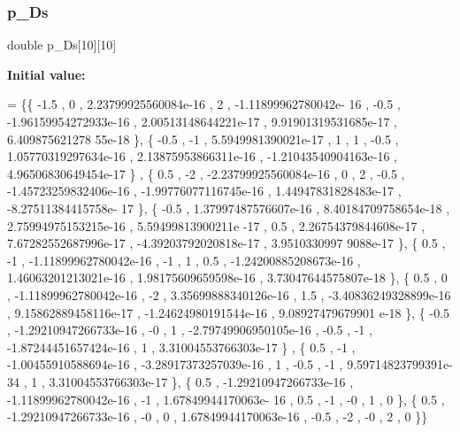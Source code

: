 \subsubsection{\texorpdfstring{p\+\_\+\+Ds}{p\_Ds}}
{\footnotesize\ttfamily double p\+\_\+\+Ds\mbox{[}10\mbox{]}\mbox{[}10\mbox{]}}

{\bfseries Initial value\+:}
\begin{DoxyCode}
= \{\{             -1.5 ,                 0 , 2.23799925560084e-16 ,                 2 , -1.11899962780042e-
      16 ,              -0.5 , -1.96159954272933e-16 , 2.00513148644221e-17 , 9.91901319531685e-17 , 6.409875621278
      55e-18 \},
\{             -0.5 ,                -1 , 5.5949981390021e-17 ,                 1 ,                 1 ,     
               -0.5 , 1.05770319297634e-16 , 2.13875953866311e-16 , -1.21043540904163e-16 , 4.96506830649454e-17 \}
      ,
\{              0.5 ,                -2 , -2.23799925560084e-16 ,                 0 ,                 2 ,   
                 -0.5 , -1.45723259832406e-16 , -1.99776077116745e-16 , 1.44947831828483e-17 , -8.27511384415758e-
      17 \},
\{             -0.5 , 1.37997487576607e-16 , 8.40184709758654e-18 , 2.75994975153215e-16 , 5.59499813900211e
      -17 ,               0.5 , 2.26754379844608e-17 , 7.67282552687996e-17 , -4.39203792020818e-17 , 3.9510330997
      9088e-17 \},
\{              0.5 ,                -1 , -1.11899962780042e-16 ,                -1 ,                 1 ,   
                  0.5 , -1.24200885208673e-16 , 1.46063201213021e-16 , 1.98175609659598e-16 , 3.73047644575807e-18
       \},
\{              0.5 ,                 0 , -1.11899962780042e-16 ,                -2 , 3.35699888340126e-16 ,
                     1.5 , -3.40836249328899e-16 , 9.15862889458116e-17 , -1.24624980191544e-16 , 9.08927479679901
      e-18 \},
\{             -0.5 , -1.29210947266733e-16 ,                -0 ,                 1 , -2.79749906950105e-16 
      ,              -0.5 ,                -1 , -1.87244451657424e-16 ,                 1 , 3.31004553766303e-17 \}
      ,
\{              0.5 ,                -1 , -1.00455910588694e-16 , -3.28917373257039e-16 ,                 1 
      ,              -0.5 ,                -1 , 9.59714823799391e-34 ,                 1 , 3.31004553766303e-17 \},
\{              0.5 , -1.29210947266733e-16 , -1.11899962780042e-16 ,                -1 , 1.67849944170063e-
      16 ,               0.5 ,                -1 ,                -0 ,                 1 ,                 0 \},
\{              0.5 , -1.29210947266733e-16 ,                -0 ,                 0 , 1.67849944170063e-16 ,
                    -0.5 ,                -2 ,                -0 ,                 2 ,                 0 \}\}
\end{DoxyCode}
\mbox{\label{a00482_a0bbb30de9136694ac606b109f3ee3fbe}} 
